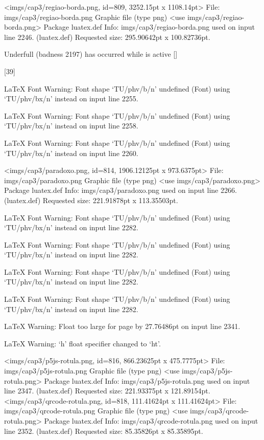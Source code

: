 <imgs/cap3/regiao-borda.png, id=809, 3252.15pt x 1108.14pt>
File: imgs/cap3/regiao-borda.png Graphic file (type png)
<use imgs/cap3/regiao-borda.png>
Package luatex.def Info: imgs/cap3/regiao-borda.png  used on input line 2246.
(luatex.def)             Requested size: 295.90642pt x 100.82736pt.

Underfull \vbox (badness 2197) has occurred while \output is active []

[39]

LaTeX Font Warning: Font shape `TU/phv/b/n' undefined
(Font)              using `TU/phv/bx/n' instead on input line 2255.


LaTeX Font Warning: Font shape `TU/phv/b/n' undefined
(Font)              using `TU/phv/bx/n' instead on input line 2258.


LaTeX Font Warning: Font shape `TU/phv/b/n' undefined
(Font)              using `TU/phv/bx/n' instead on input line 2260.

<imgs/cap3/paradoxo.png, id=814, 1906.12125pt x 973.6375pt>
File: imgs/cap3/paradoxo.png Graphic file (type png)
<use imgs/cap3/paradoxo.png>
Package luatex.def Info: imgs/cap3/paradoxo.png  used on input line 2266.
(luatex.def)             Requested size: 221.91878pt x 113.35503pt.

LaTeX Font Warning: Font shape `TU/phv/b/n' undefined
(Font)              using `TU/phv/bx/n' instead on input line 2282.


LaTeX Font Warning: Font shape `TU/phv/b/n' undefined
(Font)              using `TU/phv/bx/n' instead on input line 2282.


LaTeX Font Warning: Font shape `TU/phv/b/n' undefined
(Font)              using `TU/phv/bx/n' instead on input line 2282.


LaTeX Font Warning: Font shape `TU/phv/b/n' undefined
(Font)              using `TU/phv/bx/n' instead on input line 2282.


LaTeX Warning: Float too large for page by 27.76486pt on input line 2341.


LaTeX Warning: `h' float specifier changed to `ht'.

<imgs/cap3/p5js-rotula.png, id=816, 866.23625pt x 475.7775pt>
File: imgs/cap3/p5js-rotula.png Graphic file (type png)
<use imgs/cap3/p5js-rotula.png>
Package luatex.def Info: imgs/cap3/p5js-rotula.png  used on input line 2347.
(luatex.def)             Requested size: 221.93375pt x 121.89154pt.
<imgs/cap3/qrcode-rotula.png, id=818, 111.41624pt x 111.41624pt>
File: imgs/cap3/qrcode-rotula.png Graphic file (type png)
<use imgs/cap3/qrcode-rotula.png>
Package luatex.def Info: imgs/cap3/qrcode-rotula.png  used on input line 2352.
(luatex.def)             Requested size: 85.35826pt x 85.35895pt.

